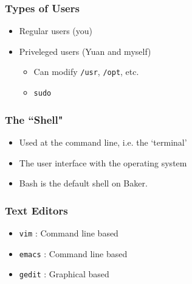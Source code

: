 \documentclass{beamer}
\newcommand{\code}[1]{\colorbox{codegray}{\texttt{#1}}}
\begin{document}
\begin{frame}
\frametitle{Types of Users}
\begin{itemize}
    \item Regular users (you)
    \bigskip

    \item Priveleged users (Yuan and myself)
    \bigskip

    \begin{itemize}
        \item Can modify \code{/usr}, \code{/opt}, etc.
        \bigskip

        \item \code{sudo}
    \end{itemize}
\end{itemize}
\end{frame}


\begin{frame}
\frametitle{The ``Shell"}
    \begin{itemize}
        \item Used at the command line, i.e. the `terminal'
        \bigskip
        \item The user interface with the operating system
        \bigskip
        \item Bash is the default shell on Baker.
    \end{itemize}
\end{frame}


\begin{frame}
\frametitle{Text Editors}
\begin{itemize}
    \item \code{vim}   : Command line based
    \bigskip
    \item \code{emacs} : Command line based
    \bigskip
    \item \code{gedit} : Graphical  based
\end{itemize}
\end{frame}
\end{document}
